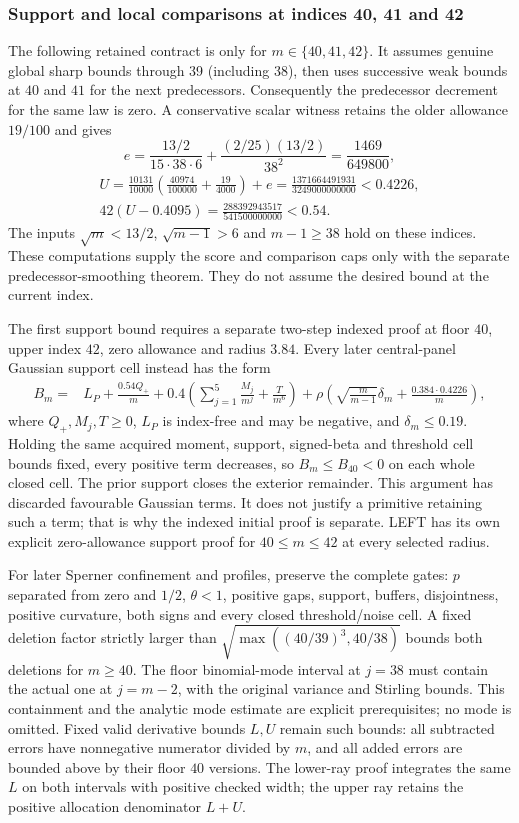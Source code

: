 \subsubsection{Support and local comparisons at indices 40, 41 and 42}
\label{ms:finite:floor40}
The following retained contract is only for $m\in\{40,41,42\}$.
It assumes genuine global sharp bounds through 39 (including 38), then uses
successive weak bounds at $40$ and $41$ for the next predecessors. Consequently the
predecessor decrement for the same law is zero. A conservative scalar witness
retains the older allowance $19/100$ and gives
\[
 e=\frac{13/2}{15\cdot38\cdot6}
   +\frac{(2/25)(13/2)}{38^2}=\frac{1469}{649800},
\]
\[
 \begin{gathered}
 U=\frac{10131}{10000}\left(\frac{40974}{100000}+\frac{19}{4000}\right)+e
 =\frac{1371664491931}{3249000000000}<0.4226,\\
 42(U-0.4095)=\frac{288392943517}{541500000000}<0.54.
 \end{gathered}
\]
The inputs $\sqrt m<13/2$, $\sqrt{m-1}>6$ and $m-1\ge38$ hold
on these indices. These computations supply the score and comparison
caps only with the separate predecessor-smoothing theorem. They do not
assume the desired bound at the current index.

The first support bound requires a separate two-step indexed proof at floor $40$,
upper index $42$, zero allowance and radius $3.84$. Every later central-panel
Gaussian support cell instead has the form
\begin{align}
 B_m={}&L_P+\frac{0.54 Q_+}{m}
 +0.4\left(\sum_{j=1}^5\frac{M_j}{m^j}+\frac{T}{m^6}\right)
 +\rho\left(\sqrt{\frac m{m-1}}\delta_m+\frac{0.384\cdot0.4226}{m}\right),
 \label{ms:finite:central-support}
\end{align}
where $Q_+,M_j,T\ge0$, $L_P$ is index-free and may be negative,
and $\delta_m\le0.19$. Holding the same acquired moment, support,
signed-beta and threshold cell bounds fixed, every positive term decreases,
so $B_m\le B_{40}<0$ on each whole closed cell. The prior support
closes the exterior remainder. This argument has discarded favourable
Gaussian terms. It does not justify a primitive retaining such a term;
that is why the indexed initial proof is separate. LEFT has its own
explicit zero-allowance support proof for $40\le m\le42$ at every
selected radius.

For later Sperner confinement and profiles, preserve the complete gates:
$p$ separated from zero and $1/2$, $\theta<1$, positive gaps, support,
buffers, disjointness, positive curvature, both signs and every closed
threshold/noise cell. A fixed deletion factor strictly larger than
$\sqrt{\max((40/39)^3,40/38)}$ bounds both deletions for $m\ge40$.
The floor binomial-mode interval at $j=38$ must contain the actual one at
$j=m-2$, with the original variance and Stirling bounds. This containment
and the analytic mode estimate are explicit prerequisites; no mode is omitted.
Fixed valid derivative bounds $L,U$ remain such bounds: all subtracted
errors have nonnegative numerator divided by $m$, and all added errors
are bounded above by their floor $40$ versions. The lower-ray proof integrates
the same $L$ on both intervals with positive checked width; the upper ray
retains the positive allocation denominator $L+U$.

